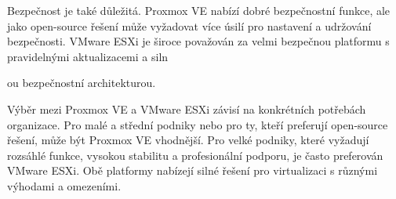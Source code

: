 Bezpečnost je také důležitá. Proxmox VE nabízí dobré bezpečnostní funkce, ale jako open-source řešení může vyžadovat více úsilí pro nastavení a udržování bezpečnosti. VMware ESXi je široce považován za velmi bezpečnou platformu s pravidelnými aktualizacemi a siln

ou bezpečnostní architekturou.

Výběr mezi Proxmox VE a VMware ESXi závisí na konkrétních potřebách organizace. Pro malé a střední podniky nebo pro ty, kteří preferují open-source řešení, může být Proxmox VE vhodnější. Pro velké podniky, které vyžadují rozsáhlé funkce, vysokou stabilitu a profesionální podporu, je často preferován VMware ESXi. Obě platformy nabízejí silné řešení pro virtualizaci s různými výhodami a omezeními.